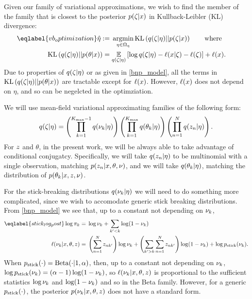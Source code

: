 Given our family of variational approximations, we wish to find the member of
the family that is closest to the posterior $p(\zeta \vert x)$ in
Kullback-Leibler (KL) divergence:
%
\begin{align}\eqlabel{vb_optimization}
%
\etaopt :={}&
    \argmin_{\eta \in \etadom}
        \KL{\q(\zeta \vert \eta) || p(\zeta \vert \x)} \mathwhere \\
\KL{\q(\zeta \vert \eta) || p(\theta \vert \x)}
={}&    \expect{\q(\zeta \vert \eta)}{
        \log \q(\zeta \vert \eta) - \logp(\x \vert \zeta) -
        \logp(\zeta)} + \logp(\x). \nonumber
%
\end{align}
%
Due to properties of $q(\zeta \vert \eta)$ or as given in \eqref{bnp_model},
all the terms in $\mathrm{KL}\left(q(\zeta \vert \eta) || p(\theta \vert x)\right)$ are tractable
except for $\ell(x)$.  However, $\ell(x)$ does not depend on $\eta$, and
so can be negelcted in the optimziation.

We will use mean-field variational approximating families of the following form:
%
\begin{align*}
%
\q(\zeta \vert \eta) =
    \left( \prod_{\k=1}^{\kmax - 1} \q(\nu_\k \vert \eta) \right)
    \left( \prod_{\k=1}^{\kmax} \q(\theta_\k \vert \eta) \right)
    \left( \prod_{\n=1}^{\N} \q(\z_{\n} \vert \eta) \right).
%
\end{align*}
%
For $z$ and $\theta$, in the present work, we will be always able to take
advantage of conditional conjugatcy.  Specifically, we will take $q(z_{n}
\vert \eta)$ to be multinomial with a single observation, matching $p(z_{n}
\vert x, \theta, \nu)$, and we will take $q(\theta_k \vert \eta)$, matching
the distribution of $p(\theta_{k} \vert x, z, \nu)$.

For the stick-breaking distributions $q(\nu_k \vert \eta)$ we will need to do
something more complicated, since we wish to accomodate generic stick breaking
distributions.  From \eqref{bnp_model} we see that, up to a constant not
depending on $\nu_k$,
%
\begin{align}\eqlabel{stick_log_post}
%
\log \pi_\k ={}&
    \log \nu_\k + \sum_{\k' < \k} \log (1 - \nu_\k) \nonumber \\
\logp(\nu_{\k} \vert \x, \theta, \z) ={}&
    \left(\sum_{\n=1}^\N \z_{\n\k'}\right) \log \nu_\k +
    \left( \sum_{\k' > \k} \sum_{\n=1}^\N \z_{\n\k'} \right) \log (1 - \nu_\k) +
    \log \pstick(\nu_\k).
%
\end{align}
%
When $p_{\mathrm{stick}}(\cdot) = \mathrm{Beta}(\cdot | 1, \alpha)$, then, up to a constant
not depending on $\nu_k$, $\log p_{\mathrm{stick}}(\nu_k) = (\alpha - 1) \log (1 -
\nu_k)$, so $\ell(\nu_{k} \vert x, \theta, z)$ is proportional to the
sufficient statistics $\log \nu_k$ and $\log(1 - \nu_k)$ and so in the
Beta family.  However, for a generic $p_{\mathrm{stick}}(\cdot)$, the posterior
$p(\nu_{k} \vert x, \theta, z)$ does not have a standard form.

